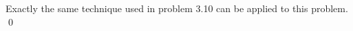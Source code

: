 \begin{pf} \rm
 Exactly the same technique used in problem 3.10 can be applied to this problem. \qed
\end{pf}
